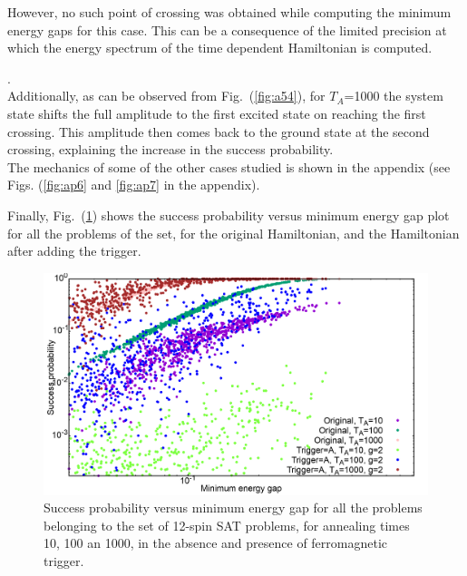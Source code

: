 \documentclass[../main.tex]{subfiles}
\begin{document}
However, no such point of crossing was obtained while computing the minimum energy gaps for this case. This can be a consequence of the limited precision at which the energy spectrum of the time dependent Hamiltonian is computed. .\\

Additionally, as can be observed from Fig.~(\ref{fig:a54}), for $T_A$=1000 the system state shifts the full amplitude to the first excited state on reaching the first crossing. This amplitude then comes back to the ground state at the second crossing, explaining the increase in the success probability.\\
The mechanics of some of the other cases studied is shown in the appendix (see Figs. (\ref{fig:ap6} and \ref{fig:ap7} in the appendix).

Finally, Fig.~(\ref{fig:a46}) shows the success probability versus minimum energy gap plot for all the problems of the set, for the original Hamiltonian, and the Hamiltonian after adding the trigger. 

\begin{figure}
\centering 
\includegraphics[scale=0.24]{SuccVsGap_OA_g2.png}
\caption{Success probability versus minimum energy gap for all the problems belonging to the set of 12-spin SAT problems, for annealing times 10, 100 an 1000, in the absence and presence of ferromagnetic trigger.}
\label{fig:a46}
\end{figure}
\end{document}

